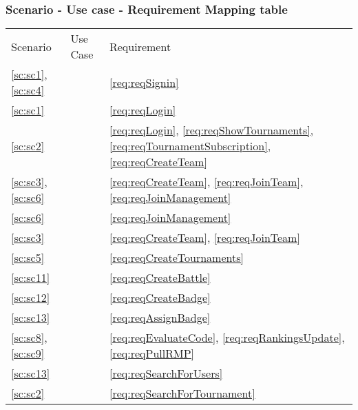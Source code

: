 \subsubsection{Scenario - Use case - Requirement Mapping table}
\begin{center}
    \begin{tabu}{|X[.2]|X[.6]|X[.2]|} \hline \everyrow{\hline}
        Scenario & Use Case & Requirement \\
        \ref{sc:sc1}, \ref{sc:sc4} &  & \ref{req:reqSignin} \\
        \ref{sc:sc1} &  & \ref{req:reqLogin} \\
        \ref{sc:sc2} &  & \ref{req:reqLogin}, \ref{req:reqShowTournaments}, \ref{req:reqTournamentSubscription}, \ref{req:reqCreateTeam}\\
        \ref{sc:sc3}, \ref{sc:sc6} &  & \ref{req:reqCreateTeam}, \ref{req:reqJoinTeam}, \ref{req:reqJoinManagement} \\
        \ref{sc:sc6} &  & \ref{req:reqJoinManagement} \\
        \ref{sc:sc3} &  & \ref{req:reqCreateTeam}, \ref{req:reqJoinTeam} \\
        \ref{sc:sc5} &  & \ref{req:reqCreateTournaments} \\
        \ref{sc:sc11} &  & \ref{req:reqCreateBattle} \\
        \ref{sc:sc12} &  & \ref{req:reqCreateBadge} \\
        \ref{sc:sc13} &  & \ref{req:reqAssignBadge} \\
        \ref{sc:sc8}, \ref{sc:sc9} &  & \ref{req:reqEvaluateCode}, \ref{req:reqRankingsUpdate}, \ref{req:reqPullRMP} \\
        \ref{sc:sc13} &  & \ref{req:reqSearchForUsers} \\
        \ref{sc:sc2} &  & \ref{req:reqSearchForTournament} \\
    \end{tabu}
\end{center}